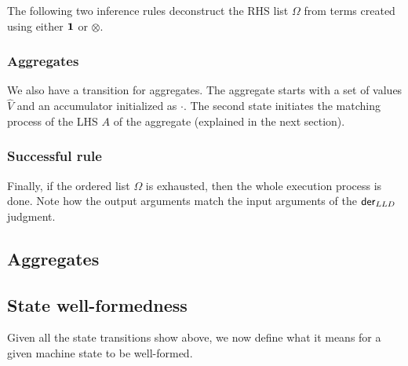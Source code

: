 The following two inference rules deconstruct the RHS list $\Omega$ from terms
created using either $\mathbf{1}$ or $\otimes$.



\subsubsection{Aggregates}

We also have a transition for aggregates. The aggregate starts with a set of
values $\widehat{V}$ and an accumulator initialized as $\cdot$. The second state
initiates the matching process of the LHS $A$ of the aggregate (explained in
the next section).



\subsubsection{Successful rule}

Finally, if the ordered list $\Omega$ is exhausted, then the whole execution
process is done.  Note how the output arguments match the input arguments of the
$\mathsf{der}_{LLD} \;$judgment.



\subsection{Aggregates}




\subsection{State well-formedness}

Given all the state transitions show above, we now define what it means for a
given machine state to be well-formed.

